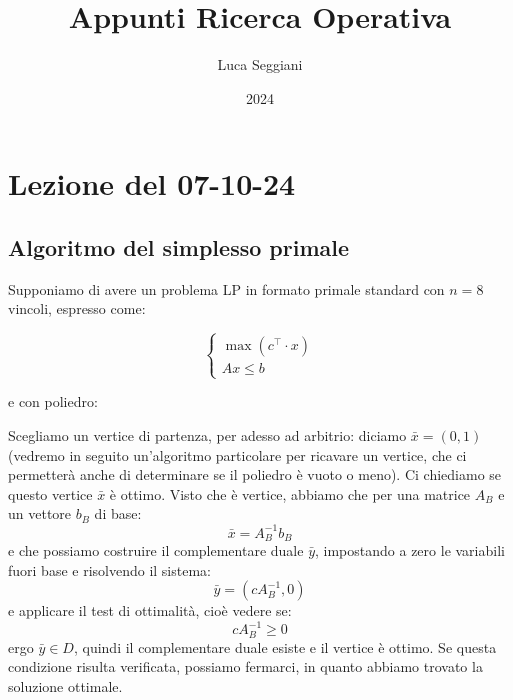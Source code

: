 \documentclass[a4paper,11pt]{article}
\title{Appunti Ricerca Operativa}
\author{Luca Seggiani}
\date{2024}
\begin{document}
\section{Lezione del 07-10-24}

\thispagestyle{empty}
\pagestyle{fancy}

\subsection{Algoritmo del simplesso primale}
Supponiamo di avere un problema LP in formato primale standard con $n = 8$ vincoli, espresso come:

\[
	\begin{cases}
		\max(c^\intercal \cdot x) \\
		Ax \leq b
	\end{cases}
\]

e con poliedro:

\begin{center}
\end{center}

Scegliamo un vertice di partenza, per adesso ad arbitrio: diciamo $\bar{x} = (0, 1)$ (vedremo in seguito un'algoritmo particolare per ricavare un vertice, che ci permetterà anche di determinare se il poliedro è vuoto o meno).
Ci chiediamo se questo vertice $\bar{x}$ è ottimo.
Visto che è vertice, abbiamo che per una matrice $A_B$ e un vettore $b_B$ di base:
$$
\bar{x} = A_B^{-1} b_B
$$
e che possiamo costruire il complementare duale $\bar{y}$, impostando a zero le variabili fuori base e risolvendo il sistema:
$$
\bar{y} = (cA_B^{-1}, 0)
$$
e applicare il test di ottimalità, cioè vedere se:
$$
cA_B^{-1} \geq 0
$$
ergo $\bar{y} \in D$, quindi il complementare duale esiste e il vertice è ottimo.
Se questa condizione risulta verificata, possiamo fermarci, in quanto abbiamo trovato la soluzione ottimale.
\end{document}
